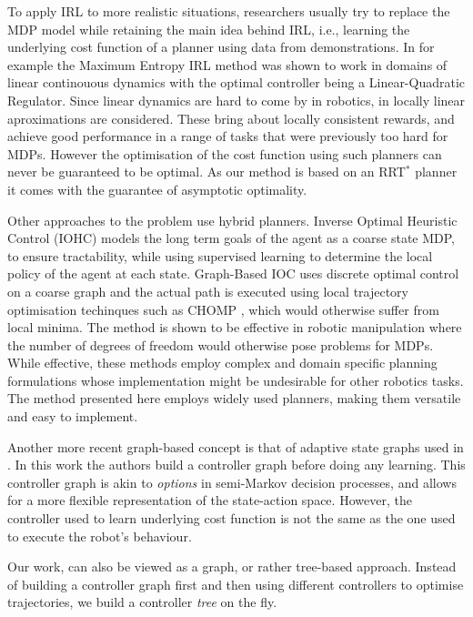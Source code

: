 \documentclass{article}  %
\begin{document}
To apply IRL to more realistic situations, researchers usually try to replace the MDP model while retaining the main idea behind IRL, i.e., learning the underlying cost function of a planner using data from demonstrations. 
 In \cite{ziebart2010modelingthesis} for example the Maximum Entropy IRL method was shown to work in domains of linear continouous dynamics with the optimal controller being a Linear-Quadratic Regulator. Since linear dynamics are hard to come by in robotics, in \cite{2012-cioc} locally linear aproximations are considered. These bring about locally consistent rewards, and achieve good performance in a range of tasks that were previously too hard for MDPs. However the optimisation of the cost function using such planners can never be guaranteed to be optimal. As our method is based on an RRT$^*$ planner it comes with the guarantee of asymptotic optimality.

Other approaches to the problem use hybrid planners. Inverse Optimal Heuristic Control (IOHC) \cite{ratliff2009inverse} models the long term goals of the agent as a coarse state MDP, to ensure tractability, while using supervised learning to determine the local policy of the agent at each state. Graph-Based IOC \cite{byravan2015graph} uses discrete optimal control on a coarse graph and the actual path is executed using local trajectory optimisation techinques such as CHOMP \cite{ratliff2009chomp}, which would otherwise suffer from local minima. The method is shown to be effective in robotic manipulation where the number of degrees of freedom would otherwise pose problems for MDPs. While effective, these methods employ complex and domain specific planning formulations whose implementation might be undesirable for other robotics tasks. The method presented here employs widely used planners, making them versatile and easy to implement. 

Another more recent graph-based concept is that of adaptive state graphs used in \cite{okallearning}. In this work the authors build a controller graph before doing any learning. This controller graph is akin to \emph{options} in semi-Markov decision processes, and allows for a more flexible representation of the state-action space. However, the controller used to learn underlying cost function is not the same as the one used to execute the robot's behaviour. 

Our work, can also be viewed as a graph, or rather tree-based approach. Instead of building a controller graph first and then using different controllers to optimise trajectories, we build a controller \emph{tree} on the fly.
\end{document}
